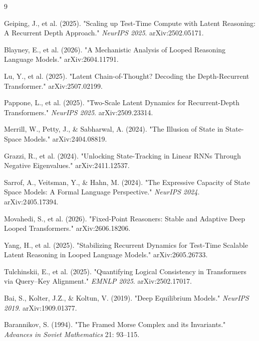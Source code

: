 \documentclass[12pt,a4paper]{article}
\begin{document}
\begin{thebibliography}{9}

Geiping, J., et al. (2025). "Scaling up Test-Time Compute with Latent Reasoning: A Recurrent Depth Approach." \textit{NeurIPS 2025}. arXiv:2502.05171.

Blayney, E., et al. (2026). "A Mechanistic Analysis of Looped Reasoning Language Models." arXiv:2604.11791.

Lu, Y., et al. (2025). "Latent Chain-of-Thought? Decoding the Depth-Recurrent Transformer." arXiv:2507.02199.

Pappone, L., et al. (2025). "Two-Scale Latent Dynamics for Recurrent-Depth Transformers." \textit{NeurIPS 2025}. arXiv:2509.23314.

Merrill, W., Petty, J., \& Sabharwal, A. (2024). "The Illusion of State in State-Space Models." arXiv:2404.08819.

Grazzi, R., et al. (2024). "Unlocking State-Tracking in Linear RNNs Through Negative Eigenvalues." arXiv:2411.12537.

Sarrof, A., Veitsman, Y., \& Hahn, M. (2024). "The Expressive Capacity of State Space Models: A Formal Language Perspective." \textit{NeurIPS 2024}. arXiv:2405.17394.

Movahedi, S., et al. (2026). "Fixed-Point Reasoners: Stable and Adaptive Deep Looped Transformers." arXiv:2606.18206.

Yang, H., et al. (2025). "Stabilizing Recurrent Dynamics for Test-Time Scalable Latent Reasoning in Looped Language Models." arXiv:2605.26733.

Tulchinskii, E., et al. (2025). "Quantifying Logical Consistency in Transformers via Query–Key Alignment." \textit{EMNLP 2025}. arXiv:2502.17017.

Bai, S., Kolter, J.Z., \& Koltun, V. (2019). "Deep Equilibrium Models." \textit{NeurIPS 2019}. arXiv:1909.01377.

Barannikov, S. (1994). "The Framed Morse Complex and its Invariants." \textit{Advances in Soviet Mathematics} 21: 93--115.

\end{thebibliography}

\newpage
\end{document}

